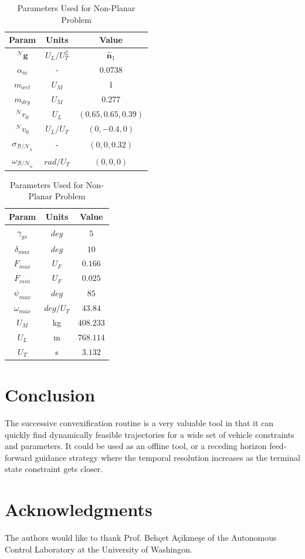 \documentclass[conf]{new-aiaa}
\begin{document}
\begin{table}[ht]
  \caption{Parameters Used for Non-Planar Problem}
  \centering 
  \begin{tabular}{c c c} 
    \hline\hline
    Param & Units & Value \\ [0.5ex] 
    \hline 
    $^\mathcal{N}\mathbf{g}$ 		& $U_L/U_T^2$ 	& $\hat{\mathbf{n}}_1$  \\ 
    $\alpha_{\dot{m}}$ 				& - 			& 0.0738  \\
    $m_{wet}$ 						& $U_M$ 		& 1  \\
    $m_{dry}$ 						& $U_M$ 		& 0.277  \\
    $^\mathcal{N}r_{0}$ 			& $U_L$ 		& $(0.65,0.65,0.39)$  \\
    $^\mathcal{N}v_{0}$ 			& $U_L/U_T$	 	& $(0,-0.4,0)$  \\
    $\sigma_{\mathcal{B/N}_0}$ 		& - 			& $(0,0,0.32)$  \\
    $\omega_{\mathcal{B/N}_0}$ 		& $rad/U_T$ 	& $(0,0,0)$ \\[1ex] 
    \hline
    \end{tabular}
    \begin{tabular}{c c c} 
    \hline\hline
    Param & Units & Value \\ [0.5ex] 
    \hline 
    $\gamma_{gs}$ 					& $deg$ 		& $5$  \\ 
    $\delta_{max}$	 				& $deg$ 		& $10$  \\
    $F_{max}$ 						& $U_F$ 		& $0.166$ \\
    $F_{min}$ 						& $U_F$ 		& $0.025$  \\
    $\psi_{max}$ 					& $deg$ 		& $85$  \\
    $\omega_{max}$ 					& $deg/U_T$	 	& $43.84$  \\
    $U_M$ 							& kg 			& $408.233$  \\
    $U_L$					 		& m			 	& $768.114$ \\
    $U_T$					 		& s			 	& $3.132$ \\[1ex] 
    \hline
  \end{tabular}
  \label{table:tablenplanar}
\end{table}









\clearpage
\section{Conclusion}
The successive convexification routine is a very valuable tool in that it can quickly find dynamically feasible trajectories for a wide set of vehicle constraints and parameters. It could be used as an offline tool, or a receding horizon feed-forward guidance strategy where the temporal resolution increases as the terminal state constraint gets closer. 

\section*{Acknowledgments}
The authors would like to thank Prof. Behçet Açikmeşe of the Autonomous Control Laboratory at the University of Washingon.


\end{document}
